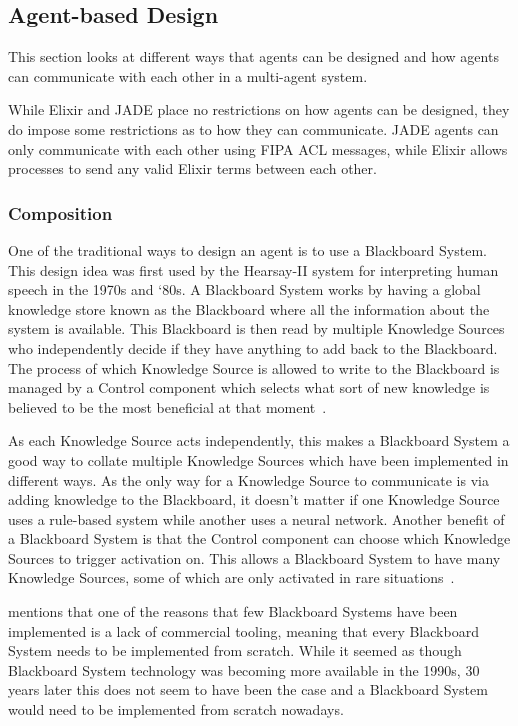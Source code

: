 \subsection{Agent-based Design}

This section looks at different ways that agents can be designed and how agents can communicate with each other in a multi-agent system.

While Elixir and JADE place no restrictions on how agents can be designed, they do impose some restrictions as to how they can communicate.
JADE agents can only communicate with each other using FIPA ACL messages, while Elixir allows processes to send any valid Elixir terms between each other.

\subsubsection{Composition}

One of the traditional ways to design an agent is to use a Blackboard System.
This design idea was first used by the Hearsay-II system for interpreting human speech in the 1970s and `80s.
A Blackboard System works by having a global knowledge store known as the Blackboard where all the information about the system is available.
This Blackboard is then read by multiple Knowledge Sources who independently decide if they have anything to add back to the Blackboard.
The process of which Knowledge Source is allowed to write to the Blackboard is managed by a Control component which selects what sort of new knowledge is believed to be the most beneficial at that moment~\cite{nii1986blackboard}.

As each Knowledge Source acts independently, this makes a Blackboard System a good way to collate multiple Knowledge Sources which have been implemented in different ways.
As the only way for a Knowledge Source to communicate is via adding knowledge to the Blackboard, it doesn't matter if one Knowledge Source uses a rule-based system while another uses a neural network.
Another benefit of a Blackboard System is that the Control component can choose which Knowledge Sources to trigger activation on.
This allows a Blackboard System to have many Knowledge Sources, some of which are only activated in rare situations~\cite{corkill1991blackboard}.

 mentions that one of the reasons that few Blackboard Systems have been implemented is a lack of commercial tooling, meaning that every Blackboard System needs to be implemented from scratch.
While it seemed as though Blackboard System technology was becoming more available in the 1990s, 30 years later this does not seem to have been the case and a Blackboard System would need to be implemented from scratch nowadays.

